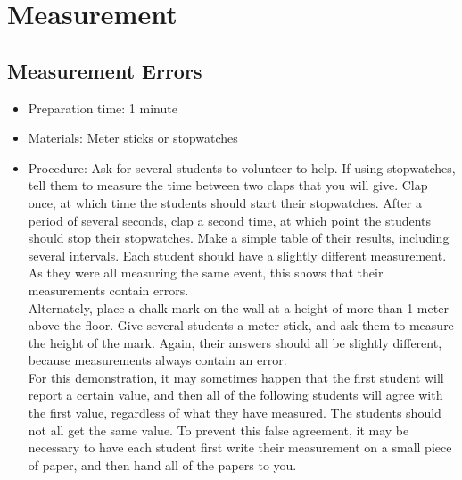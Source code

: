 \section{Measurement}

\subsection{Measurement Errors}
\begin{itemize}
\item{Preparation time: 1 minute}
\item{Materials: Meter sticks or stopwatches}
\item{Procedure: Ask for several students to volunteer to help. If using stopwatches, tell them to measure the time between two claps that you will give. Clap once, at which time the students should start their stopwatches. After a period of several seconds, clap a second time, at which point the students should stop their stopwatches. Make a simple table of their results, including several intervals. Each student should have a slightly different measurement. As they were all measuring the same event, this shows that their measurements contain errors.\\
Alternately, place a chalk mark on the wall at a height of more than 1 meter above the floor. Give several students a meter stick, and ask them to measure the height of the mark. Again, their answers should all be slightly different, because measurements always contain an error.\\
For this demonstration, it may sometimes happen that the first student will report a certain value, and then all of the following students will agree with the first value, regardless of what they have measured. The students should not all get the same value. To prevent this false agreement, it may be necessary to have each student first write their measurement on a small piece of paper, and then hand all of the papers to you.}
\end{itemize}

